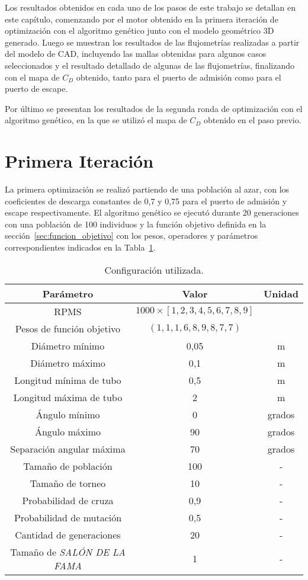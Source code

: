 Los resultados obtenidos en cada uno de los pasos de este trabajo se detallan en
este capítulo, comenzando por el motor obtenido en la primera iteración de
optimización con el algoritmo genético junto con el modelo geométrico 3D
generado.
%
Luego se muestran los resultados de las flujometrías realizadas a partir del
modelo de CAD, incluyendo las mallas obtenidas para algunos casos seleccionados
y el resultado detallado de algunas de las flujometrías, finalizando con el mapa
de $C_{D}$ obtenido, tanto para el puerto de admisión como para
el puerto de escape.

Por último se presentan los resultados de la segunda ronda de optimización con
el algoritmo genético, en la que se utilizó el mapa de $C_{D}$ obtenido en el
paso previo.

\section{Primera Iteración}
%
La primera optimización se realizó partiendo de una población al azar, con los
coeficientes de descarga constantes de 0,7 y 0,75 para el puerto de admisión y
escape respectivamente.
%
El algoritmo genético se ejecutó durante 20 generaciones con una población de
100 individuos y la función objetivo definida en la
sección~\ref{sec:funcion_objetivo} con los pesos, operadores y
parámetros correspondientes indicados en la Tabla~\ref{tab:config_genetico}.

\begin{table}[h!]
  \centering
  \begin{tabular}{ccc} \toprule
    Parámetro & Valor & Unidad \\ \midrule
    RPMS & $1000\times[1, 2, 3, 4, 5, 6, 7, 8, 9]$ & \\
    Pesos de función objetivo & $(1, 1, 1, 6, 8, 9, 8, 7, 7)$ & \\
    Diámetro mínimo & 0,05 & m \\
    Diámetro máximo & 0,1 & m \\
    Longitud mínima de tubo & 0,5 & m \\
    Longitud máxima de tubo & 2 & m \\
    Ángulo mínimo & 0 & grados \\
    Ángulo máximo & 90 & grados \\
    Separación angular máxima & 70 & grados \\
    Tamaño de población & 100 & - \\
    Tamaño de torneo & 10 & - \\
    Probabilidad de cruza & 0,9 & - \\
    Probabilidad de mutación & 0,5 & - \\
    Cantidad de generaciones & 20 & - \\
    Tamaño de \emph{SALÓN DE LA FAMA} & 1 & - \\ \bottomrule
    \end{tabular}
  \caption{Configuración utilizada.}\label{tab:config_genetico}
\end{table}

